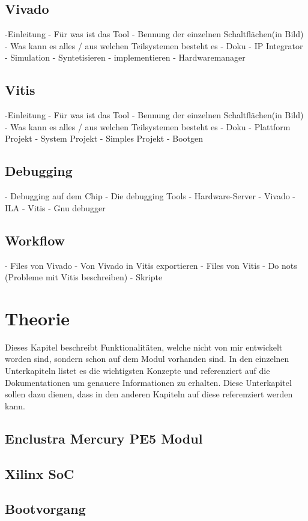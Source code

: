 \documentclass{article}
\begin{document}
\subsection{Vivado}
-Einleitung
    - Für was ist das Tool
    - Bennung der einzelnen Schaltflächen(in Bild)
    - Was kann es alles / aus welchen Teilsystemen besteht es
    - Doku
- IP Integrator
- Simulation
- Syntetisieren
- implementieren
- Hardwaremanager

\subsection{Vitis}
-Einleitung
    - Für was ist das Tool
    - Bennung der einzelnen Schaltflächen(in Bild)
    - Was kann es alles / aus welchen Teilsystemen besteht es
    - Doku
- Plattform Projekt
- System Projekt
- Simples Projekt
- Bootgen

\subsection{Debugging}
- Debugging auf dem Chip
- Die debugging Tools
    - Hardware-Server
    - Vivado
        - ILA
    - Vitis
        - Gnu debugger

\subsection{Workflow}
- Files von Vivado
- Von Vivado in Vitis exportieren
- Files von Vitis
- Do nots (Probleme mit Vitis beschreiben)
- Skripte


\section{Theorie}
Dieses Kapitel beschreibt Funktionalitäten, welche nicht von mir entwickelt worden sind, sondern schon auf dem Modul vorhanden sind. In den einzelnen Unterkapiteln listet es die wichtigsten Konzepte und referenziert auf die Dokumentationen um genauere Informationen zu erhalten. Diese Unterkapitel sollen dazu dienen, dass in den anderen Kapiteln auf diese referenziert werden kann.
\subsection{Enclustra Mercury PE5 Modul}
\subsection{Xilinx SoC}
\subsection{Bootvorgang}
\end{document}
